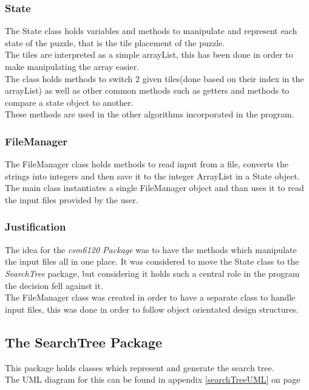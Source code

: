 \documentclass[journal]{IEEEtran}
\begin{document}
\subsubsection{State}
The State class holds variables and methods to manipulate and represent each state of the puzzle, that is the tile placement of the puzzle. \\
The tiles are interpreted as a simple arrayList, this has been done in order to make manipulating the array easier. \\
The class holds methods to switch 2 given tiles(done based on their index in the arrayList) as well as other common methods such as getters and methods to compare a state object to another. \\
These methods are used in the other algorithms incorporated in the program. \\

\subsubsection{FileManager}
The FileManager class holds methods to read input from a file, converts the strings into integers and then save it to the integer ArrayList in a State object. \\
The main class instantiates a single FileManager object and than uses it to read the input files provided by the user.\\

\subsubsection{Justification}
The idea for the \textit{csm6120 Package} was to have the methods which manipulate the input files all in one place. It was considered to move the State class to the \textit{SearchTree} package, but considering it holds such a central role in the program the decision fell against it. \\
The FileManager class was created in order to have a separate class to handle input files, this was done in order to follow object orientated design structures. \\

\subsection{The SearchTree Package}\label{sec:searchTreePackage}
This package holds classes which represent and generate the search tree.\\
The UML diagram for this can be found in appendix \ref{searchTreeUML} on page \pageref{searchTreeUML}\\
\end{document}
